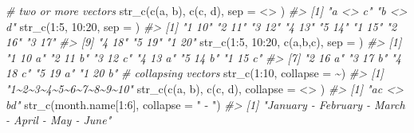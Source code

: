 \documentclass[
]{book}
\newenvironment{Shaded}{\begin{snugshade}}{\end{snugshade}}
\newcommand{\AttributeTok}[1]{\textcolor[rgb]{0.77,0.63,0.00}{#1}}
\newcommand{\CommentTok}[1]{\textcolor[rgb]{0.56,0.35,0.01}{\textit{#1}}}
\newcommand{\DecValTok}[1]{\textcolor[rgb]{0.00,0.00,0.81}{#1}}
\newcommand{\FunctionTok}[1]{\textcolor[rgb]{0.00,0.00,0.00}{#1}}
\newcommand{\NormalTok}[1]{#1}
\newcommand{\SpecialCharTok}[1]{\textcolor[rgb]{0.00,0.00,0.00}{#1}}
\newcommand{\StringTok}[1]{\textcolor[rgb]{0.31,0.60,0.02}{#1}}
\begin{document}
\begin{Shaded}
\begin{Highlighting}[]
\CommentTok{\# two or more vectors}
\FunctionTok{str\_c}\NormalTok{(}\FunctionTok{c}\NormalTok{(}\StringTok{\textquotesingle{}a\textquotesingle{}}\NormalTok{, }\StringTok{\textquotesingle{}b\textquotesingle{}}\NormalTok{), }\FunctionTok{c}\NormalTok{(}\StringTok{\textquotesingle{}c\textquotesingle{}}\NormalTok{, }\StringTok{\textquotesingle{}d\textquotesingle{}}\NormalTok{), }\AttributeTok{sep =} \StringTok{\textquotesingle{} \textless{}\textgreater{} \textquotesingle{}}\NormalTok{)}
\CommentTok{\#\textgreater{} [1] "a \textless{}\textgreater{} c" "b \textless{}\textgreater{} d"}
\FunctionTok{str\_c}\NormalTok{(}\DecValTok{1}\SpecialCharTok{:}\DecValTok{5}\NormalTok{, }\DecValTok{10}\SpecialCharTok{:}\DecValTok{20}\NormalTok{, }\AttributeTok{sep =} \StringTok{\textquotesingle{} \textquotesingle{}}\NormalTok{)}
\CommentTok{\#\textgreater{}  [1] "1 10" "2 11" "3 12" "4 13" "5 14" "1 15" "2 16" "3 17"}
\CommentTok{\#\textgreater{}  [9] "4 18" "5 19" "1 20"}
\FunctionTok{str\_c}\NormalTok{(}\DecValTok{1}\SpecialCharTok{:}\DecValTok{5}\NormalTok{, }\DecValTok{10}\SpecialCharTok{:}\DecValTok{20}\NormalTok{, }\FunctionTok{c}\NormalTok{(}\StringTok{\textquotesingle{}a\textquotesingle{}}\NormalTok{,}\StringTok{\textquotesingle{}b\textquotesingle{}}\NormalTok{,}\StringTok{\textquotesingle{}c\textquotesingle{}}\NormalTok{), }\AttributeTok{sep =} \StringTok{\textquotesingle{} \textquotesingle{}}\NormalTok{)}
\CommentTok{\#\textgreater{}  [1] "1 10 a" "2 11 b" "3 12 c" "4 13 a" "5 14 b" "1 15 c"}
\CommentTok{\#\textgreater{}  [7] "2 16 a" "3 17 b" "4 18 c" "5 19 a" "1 20 b"}
\CommentTok{\# collapsing vectors}
\FunctionTok{str\_c}\NormalTok{(}\DecValTok{1}\SpecialCharTok{:}\DecValTok{10}\NormalTok{, }\AttributeTok{collapse =} \StringTok{\textquotesingle{}\textasciitilde{}\textquotesingle{}}\NormalTok{)}
\CommentTok{\#\textgreater{} [1] "1\textasciitilde{}2\textasciitilde{}3\textasciitilde{}4\textasciitilde{}5\textasciitilde{}6\textasciitilde{}7\textasciitilde{}8\textasciitilde{}9\textasciitilde{}10"}
\FunctionTok{str\_c}\NormalTok{(}\FunctionTok{c}\NormalTok{(}\StringTok{\textquotesingle{}a\textquotesingle{}}\NormalTok{, }\StringTok{\textquotesingle{}b\textquotesingle{}}\NormalTok{), }\FunctionTok{c}\NormalTok{(}\StringTok{\textquotesingle{}c\textquotesingle{}}\NormalTok{, }\StringTok{\textquotesingle{}d\textquotesingle{}}\NormalTok{), }\AttributeTok{collapse =} \StringTok{\textquotesingle{} \textless{}\textgreater{} \textquotesingle{}}\NormalTok{)}
\CommentTok{\#\textgreater{} [1] "ac \textless{}\textgreater{} bd"}
\FunctionTok{str\_c}\NormalTok{(month.name[}\DecValTok{1}\SpecialCharTok{:}\DecValTok{6}\NormalTok{], }\AttributeTok{collapse =} \StringTok{" {-} "}\NormalTok{)}
\CommentTok{\#\textgreater{} [1] "January {-} February {-} March {-} April {-} May {-} June"}


\end{Highlighting}
\end{Shaded}
\end{document}
